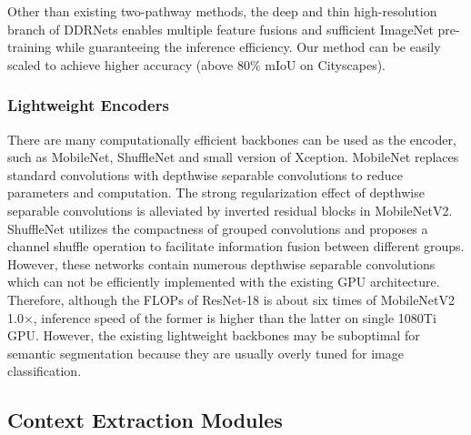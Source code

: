 \documentclass[journal]{IEEEtran}
\begin{document}
Other than existing two-pathway methods, the deep and thin high-resolution branch of DDRNets enables multiple feature fusions and sufficient ImageNet pre-training while guaranteeing the inference efficiency. Our method can be easily scaled to achieve higher accuracy (above 80$\%$ mIoU on Cityscapes). 

\subsubsection{Lightweight Encoders}

There are many computationally efficient backbones can be used as the encoder, such as MobileNet\cite{howard2017mobilenets}, ShuffleNet\cite{zhang2018shufflenet} and small version of Xception\cite{chollet2017xception}. MobileNet replaces standard convolutions with depthwise separable convolutions to reduce parameters and computation. The strong regularization effect of depthwise separable convolutions is alleviated by inverted residual blocks in MobileNetV2\cite{sandler2018mobilenetv2}. ShuffleNet utilizes the compactness of grouped convolutions and proposes a channel shuffle operation to facilitate information fusion between different groups. However, these networks contain numerous depthwise separable convolutions which can not be efficiently implemented with the existing GPU architecture. Therefore, although the FLOPs of ResNet-18\cite{he2016deep} is about six times of MobileNetV2 1.0$\times$, inference speed of the former is higher than the latter on single 1080Ti GPU\cite{orsic2019defense}. However, the existing lightweight backbones may be suboptimal for semantic segmentation because they are usually overly tuned for image classification.



\subsection{Context Extraction Modules}
\end{document}
